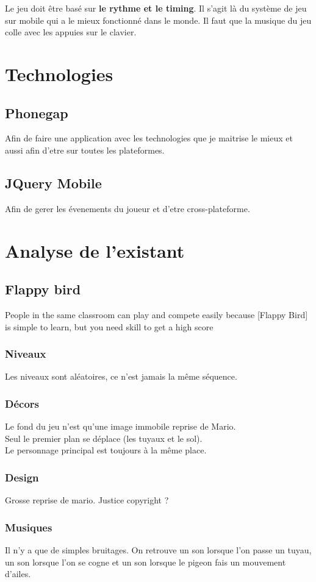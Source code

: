 \documentclass{article}
\begin{document}
Le jeu doit être basé sur \textbf{le rythme et le timing}. Il s'agit là du système de jeu sur mobile qui a le mieux fonctionné dans le monde. Il faut que la musique du jeu colle avec les appuies sur le clavier.\\
\section{Technologies}
\subsection{Phonegap}
Afin de faire une application avec les technologies que je maitrise le mieux et aussi afin d'etre sur toutes les plateformes.
\subsection{JQuery Mobile}
Afin de gerer les évenements du joueur et d'etre cross-plateforme.
\section{Analyse de l'existant}
\subsection{Flappy bird}
People in the same classroom can play and compete easily because [Flappy Bird] is simple to learn, but you need skill to get a high score

\subsubsection{Niveaux}
Les niveaux sont aléatoires, ce n'est jamais la même séquence.

\subsubsection{Décors}
Le fond du jeu n'est qu'une image immobile reprise de Mario.\\
Seul le premier plan se déplace (les tuyaux et le sol).\\
Le personnage principal est toujours à la même place.

\subsubsection{Design}
Grosse reprise de mario. Justice copyright ?

\subsubsection{Musiques}
Il n'y a que de simples bruitages. On retrouve un son lorsque l'on passe un tuyau, un son lorsque l'on se cogne et un son lorsque le pigeon fais un mouvement d'ailes.
\end{document}
